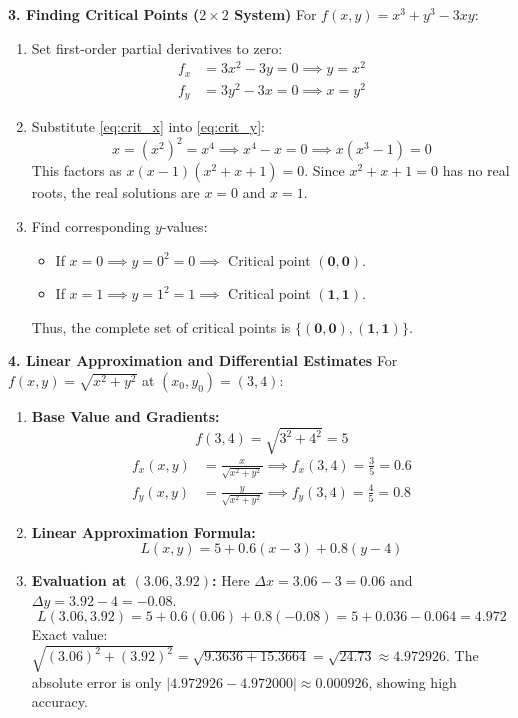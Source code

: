 \textbf{3. Finding Critical Points ($2 \times 2$ System)}
For $f(x, y) = x^3 + y^3 - 3xy$:
\begin{enumerate}
    \item Set first-order partial derivatives to zero:
    \begin{align}
    f_x &= 3x^2 - 3y = 0 \implies y = x^2 \label{eq:crit_x} \\
    f_y &= 3y^2 - 3x = 0 \implies x = y^2 \label{eq:crit_y}
    \end{align}
    \item Substitute \eqref{eq:crit_x} into \eqref{eq:crit_y}:
    \begin{equation*}
    x = (x^2)^2 = x^4 \implies x^4 - x = 0 \implies x(x^3 - 1) = 0
    \end{equation*}
    This factors as $x(x - 1)(x^2 + x + 1) = 0$. Since $x^2 + x + 1 = 0$ has no real roots, the real solutions are $x = 0$ and $x = 1$.
    \item Find corresponding $y$-values:
    \begin{itemize}
        \item If $x = 0 \implies y = 0^2 = 0 \implies$ Critical point $\mathbf{(0, 0)}$.
        \item If $x = 1 \implies y = 1^2 = 1 \implies$ Critical point $\mathbf{(1, 1)}$.
    \end{itemize}
    Thus, the complete set of critical points is $\mathbf{\{(0, 0), (1, 1)\}}$.
\end{enumerate}

\textbf{4. Linear Approximation and Differential Estimates}
For $f(x, y) = \sqrt{x^2 + y^2}$ at $(x_0, y_0) = (3, 4)$:
\begin{enumerate}
    \item \textbf{Base Value and Gradients:}
    \begin{equation*}
    f(3, 4) = \sqrt{3^2 + 4^2} = 5
    \end{equation*}
    \begin{align*}
    f_x(x, y) &= \frac{x}{\sqrt{x^2 + y^2}} \implies f_x(3, 4) = \frac{3}{5} = 0.6 \\
    f_y(x, y) &= \frac{y}{\sqrt{x^2 + y^2}} \implies f_y(3, 4) = \frac{4}{5} = 0.8
    \end{align*}
    \item \textbf{Linear Approximation Formula:}
    \begin{equation*}
    L(x, y) = 5 + 0.6(x - 3) + 0.8(y - 4)
    \end{equation*}
    \item \textbf{Evaluation at $(3.06, 3.92)$:}
    Here $\Delta x = 3.06 - 3 = 0.06$ and $\Delta y = 3.92 - 4 = -0.08$.
    \begin{equation*}
    L(3.06, 3.92) = 5 + 0.6(0.06) + 0.8(-0.08) = 5 + 0.036 - 0.064 = \mathbf{4.972}
    \end{equation*}
    Exact value: $\sqrt{(3.06)^2 + (3.92)^2} = \sqrt{9.3636 + 15.3664} = \sqrt{24.73} \approx 4.972926$.
    The absolute error is only $|4.972926 - 4.972000| \approx 0.000926$, showing high accuracy.
\end{enumerate}

